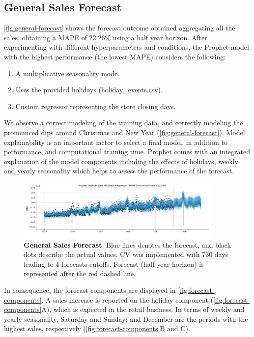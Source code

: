 \subsection[General Sales Forecast]{General Sales Forecast}
\label{sec:general}

\autoref{fig:general-forecast} shows the forecast outcome obtained aggregating all the sales, obtaining a MAPE of 22.26\% using a half year horizon. After experimenting with different hyperparameters and conditions,  the Prophet model with the highest performance (the lowest MAPE) considers the following: 

\begin{enumerate}
\item A multiplicative seasonality mode.
\item Uses the provided holidays (holiday\_events.csv).
\item Custom regressor representing the store closing days.
\end{enumerate}
  
We observe a correct modeling of the training data, and correctly modeling the pronounced dips around Christmas and New Year (\autoref{fig:general-forecast}). Model explainability is an important factor to select a final model, in addition to performance, and computational training time. Prophet comes with an integrated explanation of the model components including the effects of holidays, weekly and yearly seasonality which helps to assess the performance of the forecast.

\begin{figure}[!htb]
  \centering
  \includegraphics[width=0.9\textwidth]{plots/forecast/forecast_prophet.png}
  \caption[General Sales Forecast]{\textbf{General Sales Forecast}. Blue lines denotes the forecast, and black dots describe the actual values. CV was implemented with 730 days leading to 4 forecasts cutoffs. Forecast (half year horizon) is represented after the red dashed line. }
  \label{fig:general-forecast}
\end{figure}

In consequence, the forecast components are displayed in \autoref{fig:forecast-components}. A sales increase is reported on the holiday component (\autoref{fig:forecast-components}A), which is expected in the retail business. In terms of weekly and yearly seasonality, Saturday and Sunday; and December are the periods with the highest sales, respectively (\autoref{fig:forecast-components}B and C).

